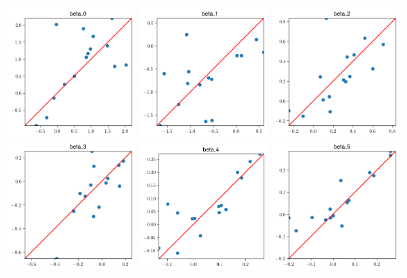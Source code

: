 \begin{figure}
    \centering
    \includegraphics[width=0.3\textwidth]{files/plots/scatter/beta_0.png}
    \includegraphics[width=0.3\textwidth]{files/plots/scatter/beta_1.png}
    \includegraphics[width=0.3\textwidth]{files/plots/scatter/beta_2.png}
    \includegraphics[width=0.3\textwidth]{files/plots/scatter/beta_3.png}
    \includegraphics[width=0.3\textwidth]{files/plots/scatter/beta_4.png}
    \includegraphics[width=0.3\textwidth]{files/plots/scatter/beta_5.png}

\end{figure}
